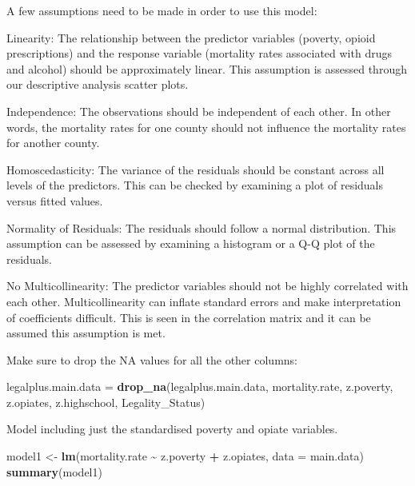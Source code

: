 \documentclass[
]{article}
\newenvironment{Shaded}{\begin{snugshade}}{\end{snugshade}}
\newcommand{\AttributeTok}[1]{\textcolor[rgb]{0.13,0.29,0.53}{#1}}
\newcommand{\FunctionTok}[1]{\textcolor[rgb]{0.13,0.29,0.53}{\textbf{#1}}}
\newcommand{\NormalTok}[1]{#1}
\newcommand{\OtherTok}[1]{\textcolor[rgb]{0.56,0.35,0.01}{#1}}
\newcommand{\SpecialCharTok}[1]{\textcolor[rgb]{0.81,0.36,0.00}{\textbf{#1}}}
\begin{document}
A few assumptions need to be made in order to use this model:

Linearity: The relationship between the predictor variables (poverty,
opioid prescriptions) and the response variable (mortality rates
associated with drugs and alcohol) should be approximately linear. This
assumption is assessed through our descriptive analysis scatter plots.

Independence: The observations should be independent of each other. In
other words, the mortality rates for one county should not influence the
mortality rates for another county.

Homoscedasticity: The variance of the residuals should be constant
across all levels of the predictors. This can be checked by examining a
plot of residuals versus fitted values.

Normality of Residuals: The residuals should follow a normal
distribution. This assumption can be assessed by examining a histogram
or a Q-Q plot of the residuals.

No Multicollinearity: The predictor variables should not be highly
correlated with each other. Multicollinearity can inflate standard
errors and make interpretation of coefficients difficult. This is seen
in the correlation matrix and it can be assumed this assumption is met.

Make sure to drop the NA values for all the other columns:

\begin{Shaded}
\begin{Highlighting}[]
\NormalTok{legalplus.main.data }\OtherTok{=} \FunctionTok{drop\_na}\NormalTok{(legalplus.main.data, mortality.rate, z.poverty, z.opiates, z.highschool, Legality\_Status)}
\end{Highlighting}
\end{Shaded}

Model including just the standardised poverty and opiate variables.

\begin{Shaded}
\begin{Highlighting}[]
\NormalTok{model1 }\OtherTok{\textless{}{-}} \FunctionTok{lm}\NormalTok{(mortality.rate }\SpecialCharTok{\textasciitilde{}}\NormalTok{ z.poverty }\SpecialCharTok{+}\NormalTok{ z.opiates, }\AttributeTok{data =}\NormalTok{ main.data)}
\FunctionTok{summary}\NormalTok{(model1)}
\end{Highlighting}
\end{Shaded}
\end{document}
